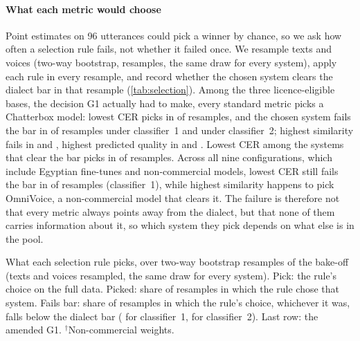 \paragraph{What each metric would choose}
Point estimates on 96 utterances could pick a winner by chance, so we ask how often a selection rule fails, not
whether it failed once. We resample texts and voices (two-way bootstrap,  resamples, the same draw for every
system), apply each rule in every resample, and record whether the chosen system clears the dialect bar in that
resample (\cref{tab:selection}). Among the three licence-eligible bases, the decision G1 actually had to make, every
standard metric picks a Chatterbox model: lowest CER picks  in 
of resamples, and the chosen system fails the bar in  of resamples under classifier~1 and
 under classifier~2; highest similarity fails in  and
, highest predicted quality in  and
. Lowest CER among the systems that clear the bar picks \vox in
 of resamples. Across all nine configurations, which include Egyptian fine-tunes and
non-commercial models, lowest CER still fails the bar in  of resamples (classifier~1), while
highest similarity happens to pick OmniVoice, a non-commercial model that clears it. The failure is therefore not that
every metric always points away from the dialect, but that none of them carries information about it, so which system
they pick depends on what else is in the pool.

\begin{table}[t]
\centering\small
\caption{What each selection rule picks, over  two-way bootstrap resamples of the bake-off (texts and voices
resampled, the same draw for every system). Pick: the rule's choice on the full data. Picked: share of resamples in
which the rule chose that system. Fails bar: share of resamples in which the rule's choice, whichever it was, falls
below the dialect bar ( for classifier~1,  for classifier~2). Last row: the amended G1.
$^\dagger$Non-commercial weights.}
\label{tab:selection}
\begin{adjustbox}{max width=\linewidth}
\end{adjustbox}
\end{table}

